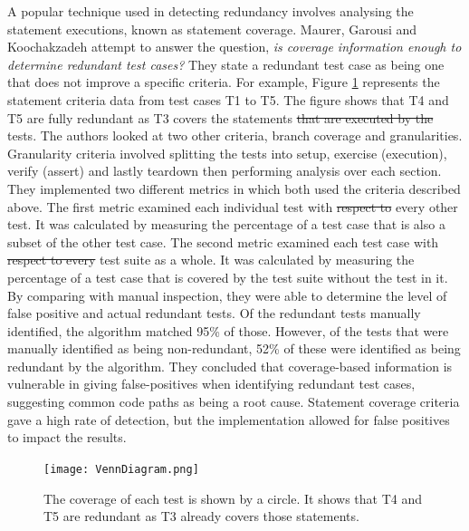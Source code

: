 \documentclass[11pt
              , a4paper
              , twoside
              , openright
              ]{report}
\providecommand{\DIFadd}[1]{{\protect\color{blue}\uwave{#1}}} %
\providecommand{\DIFdel}[1]{{\protect\color{red}\sout{#1}}}                      %
\providecommand{\DIFaddbegin}{} %
\providecommand{\DIFaddend}{} %
\providecommand{\DIFdelbegin}{} %
\providecommand{\DIFdelend}{} %
\begin{document}
A popular technique used in detecting redundancy involves analysing the statement executions, known as statement coverage. Maurer, Garousi and Koochakzadeh \cite{koochakzadeh2009test} attempt to answer the question, \textit{is coverage information enough to determine redundant test cases?} They state a redundant test case as being one that does not improve a specific criteria. For example, Figure \ref{fig:venndiagram} represents the statement criteria data from test cases T1 to T5. The figure shows that T4 and T5 are fully redundant as T3 covers the statements \DIFdelbegin \DIFdel{that are executed by the }\DIFdelend \DIFaddbegin \DIFadd{executed by these }\DIFaddend tests. The authors looked at two other criteria, branch coverage and granularities. Granularity criteria involved splitting the tests into setup, exercise (execution), verify (assert) and lastly teardown then performing analysis over each section. They implemented two different metrics in which both used the criteria described above. The first metric examined each individual test with \DIFdelbegin \DIFdel{respect to }\DIFdelend every other test. It was calculated by measuring the percentage of a test case that is also a subset of the other test case. The second metric examined each test case with \DIFdelbegin \DIFdel{respect to every }\DIFdelend \DIFaddbegin \DIFadd{the }\DIFaddend test suite as a whole. It was calculated by measuring the percentage of a test case that is covered by the test suite without the test in it. By comparing with manual inspection, they were able to determine the level of false positive and actual redundant tests. Of the redundant tests manually identified, the algorithm matched 95\% of those. However, of the tests that were manually identified as being non-redundant, 52\% of these were identified as being redundant by the algorithm. They concluded that coverage-based information is vulnerable in giving false-positives when identifying redundant test cases, suggesting common code paths as being a root cause. Statement coverage criteria gave a high rate of detection, but the implementation allowed for false positives to impact the results. 

\begin{figure}[h]
\begin{center}
\texttt{[image: VennDiagram.png]}
\end{center}
\caption{The coverage of each test is shown by a circle. It shows that T4 and T5 are redundant as T3 already covers those statements.}
\label{fig:venndiagram}
\end{figure}
\end{document}
